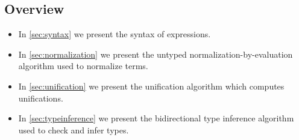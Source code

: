 \subsection{Overview}

\begin{itemize}
    \item In \cref{sec:syntax} we present the syntax of expressions.
    \item In \cref{sec:normalization} we present the untyped normalization-by-evaluation algorithm used to normalize terms.
    \item In \cref{sec:unification} we present the unification algorithm which computes unifications.
    \item In \cref{sec:typeinference} we present the bidirectional type inference algorithm used to check and infer types.
\end{itemize}